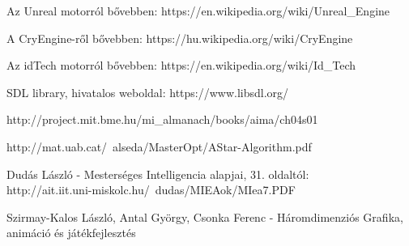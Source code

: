 \begin{thebibliography}{x}

Az Unreal motorról bővebben: https://en.wikipedia.org/wiki/Unreal\_Engine

A CryEngine-ről bővebben: https://hu.wikipedia.org/wiki/CryEngine

Az idTech motorról bővebben: https://en.wikipedia.org/wiki/Id\_Tech

SDL library, hivatalos weboldal: https://www.libsdl.org/

http://project.mit.bme.hu/mi\_almanach/books/aima/ch04s01

http://mat.uab.cat/~alseda/MasterOpt/AStar-Algorithm.pdf

Dudás László - Mesterséges Intelligencia alapjai, 31. oldaltól:\\http://ait.iit.uni-miskolc.hu/~dudas/MIEAok/MIea7.PDF

Szirmay-Kalos László, Antal György, Csonka Ferenc - Háromdimenziós Grafika, animáció és játékfejlesztés

\end{thebibliography}
